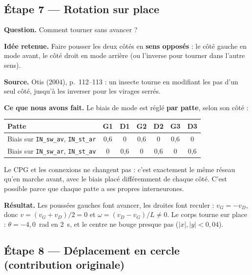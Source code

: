 \documentclass[11pt]{article}
\newcommand{\champ}[2]{\par\noindent\textbf{\color{bleu}#1} #2\par}
\newcommand{\code}[1]{\texttt{#1}}
\begin{document}
\subsection*{Étape 7 --- Rotation sur place}

\champ{Question.}{Comment tourner sans avancer ?}
\champ{Idée retenue.}{Faire pousser les deux côtés en \textbf{sens opposés} : le côté gauche en
mode avant, le côté droit en mode arrière (ou l'inverse pour tourner dans l'autre sens).}
\champ{Source.}{Otis (2004), p.~112--113 \cite{otis2004} : un insecte tourne en modifiant les pas
d'un seul côté, jusqu'à les inverser pour les virages serrés.}
\champ{Ce que nous avons fait.}{Le biais de mode est réglé \textbf{par patte}, selon son côté :}
\begin{center}
\small
\begin{tabular}{lcccccc}
  \toprule
  \textbf{Patte} & G1 & D1 & G2 & D2 & G3 & D3\\ \midrule
  Biais sur \code{IN\_sw\_av}, \code{IN\_st\_ar} & 0,6 & 0 & 0,6 & 0 & 0,6 & 0\\
  Biais sur \code{IN\_sw\_ar}, \code{IN\_st\_av} & 0 & 0,6 & 0 & 0,6 & 0 & 0,6\\ \bottomrule
\end{tabular}
\end{center}
Le CPG et les connexions ne changent pas : c'est exactement le même réseau qu'en marche avant, avec
le biais placé différemment de chaque côté. C'est possible parce que chaque patte a ses propres
interneurones.

\champ{Résultat.}{Les poussées gauches font avancer, les droites font reculer :
$v_G = -v_D$, donc $v = (v_G + v_D)/2 = 0$ et $\omega = (v_D - v_G)/L \neq 0$. Le corps tourne sur
place : $\theta = -4{,}0$~rad en 2~s, et le centre ne bouge presque pas ($|x|, |y| < 0{,}04$).}

\subsection*{Étape 8 --- Déplacement en cercle (contribution originale)}
\end{document}
